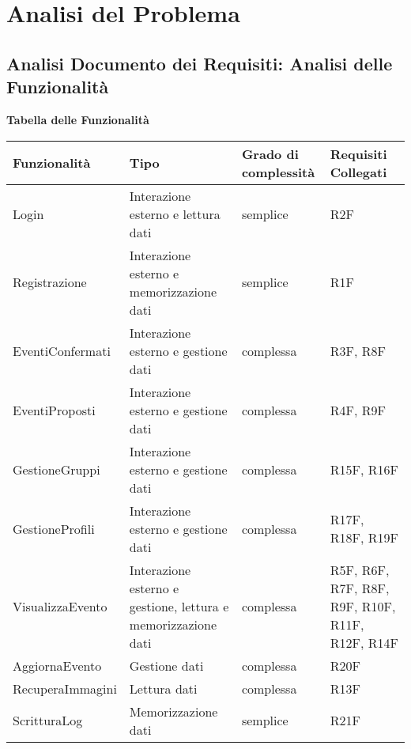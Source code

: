 \newpage
\section{Analisi del Problema}
\subsection{Analisi Documento dei Requisiti: Analisi delle Funzionalità}
\hfill \break

\textbf{Tabella delle Funzionalità}
\hfill \break

\begin{tabular} {|P{4cm}|P{4cm}|P{3.5cm}|P{4cm}|}
    \hline
    \textbf{Funzionalità} & \textbf{Tipo}                                                 & \textbf{Grado di complessità} & \textbf{Requisiti Collegati}                    \\
    \hline
    Login                 & Interazione esterno e lettura dati                            & semplice                      & R2F                                             \\
    \hline
    Registrazione         & Interazione esterno e memorizzazione dati                     & semplice                      & R1F                                             \\
    \hline
    EventiConfermati      & Interazione esterno e gestione dati                           & complessa                     & R3F, R8F                                        \\
    \hline
    EventiProposti        & Interazione esterno e gestione dati                           & complessa                     & R4F, R9F                                        \\
    \hline
    GestioneGruppi        & Interazione esterno e gestione dati                           & complessa                     & R15F, R16F                                      \\
    \hline
    GestioneProfili       & Interazione esterno e gestione dati                           & complessa                     & R17F, R18F, R19F                                \\
    \hline
    VisualizzaEvento      & Interazione esterno e gestione, lettura e memorizzazione dati & complessa                     & R5F, R6F, R7F, R8F, R9F, R10F, R11F, R12F, R14F \\
    \hline
    AggiornaEvento        & Gestione dati                                                 & complessa                     & R20F                                            \\
    \hline
    RecuperaImmagini      & Lettura dati                                                  & complessa                     & R13F                                            \\
    \hline
    ScritturaLog          & Memorizzazione dati                                           & semplice                      & R21F                                            \\
    \hline
\end{tabular}

